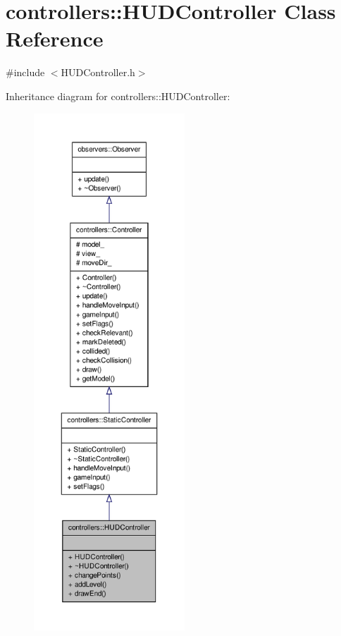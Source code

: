 \hypertarget{classcontrollers_1_1HUDController}{\section{controllers\-:\-:\-H\-U\-D\-Controller \-Class \-Reference}
\label{dc/dc4/classcontrollers_1_1HUDController}
}


{\ttfamily \#include $<$\-H\-U\-D\-Controller.\-h$>$}



\-Inheritance diagram for controllers\-:\-:\-H\-U\-D\-Controller\-:
\nopagebreak
\begin{figure}[H]
\begin{center}
\leavevmode
\includegraphics[height=550pt]{dc/dbd/classcontrollers_1_1HUDController__inherit__graph}
\end{center}
\end{figure}


